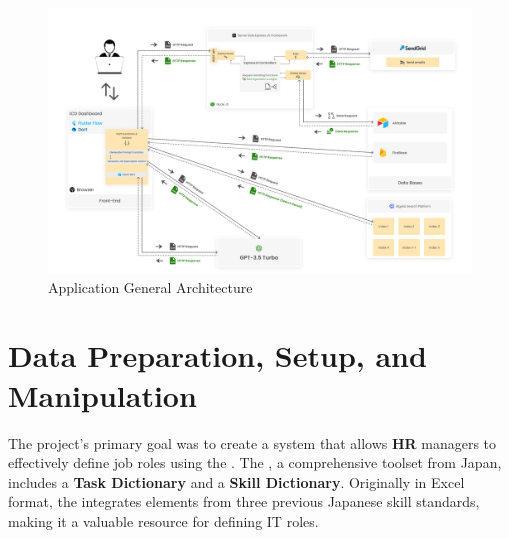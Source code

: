 \begin{landscape}
    \begin{figure}
        \centering
        \includegraphics[width=0.95\linewidth]{src/assets/images/ICD-Application-Global-Architecture-Final-Edition.jpg}
        \caption{Application General Architecture}
        \label{fig:GeneralArchitecture}
    \end{figure}
\end{landscape}



\section{Data Preparation, Setup, and Manipulation}
The project's primary goal was to create a system that allows {\color{newBlue}\textbf{HR}} managers to effectively define job roles using the . The , a comprehensive toolset from Japan, includes a {\color{darkPurple}\textbf{Task Dictionary}} and a {\color{darkgreen}\textbf{Skill Dictionary}}. Originally in Excel format, the  integrates elements from three previous Japanese skill standards, making it a valuable resource for defining IT roles.


